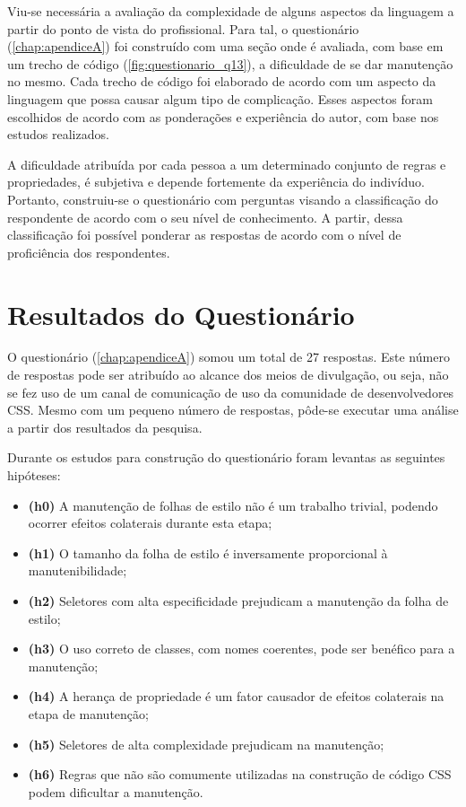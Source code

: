 Viu-se necessária a avaliação da complexidade de alguns aspectos da linguagem a partir do ponto de vista do profissional. Para tal, o questionário (\autoref{chap:apendiceA}) foi construído com uma seção onde é avaliada, com base em um trecho de código (\autoref{fig:questionario_q13}), a dificuldade de se dar manutenção no mesmo. Cada trecho de código foi elaborado de acordo com um aspecto da linguagem que possa causar algum tipo de complicação. Esses aspectos foram escolhidos de acordo com as ponderações e experiência do autor, com base nos estudos realizados.

A dificuldade atribuída por cada pessoa a um determinado conjunto de regras e propriedades, é subjetiva e depende fortemente da experiência do indivíduo. Portanto, construiu-se o questionário com perguntas visando a classificação do respondente de acordo com o seu nível de conhecimento. A partir, dessa classificação foi possível ponderar as respostas de acordo com o nível de proficiência dos respondentes.

\section{Resultados do Questionário}

O questionário (\autoref{chap:apendiceA}) somou um total de 27 respostas. Este número de respostas pode ser atribuído ao alcance dos meios de divulgação, ou seja, não se fez uso de um canal de comunicação de uso da comunidade de desenvolvedores CSS. Mesmo com um pequeno número de respostas, pôde-se executar uma análise a partir dos resultados da pesquisa. 

Durante os estudos para construção do questionário foram levantas as seguintes hipóteses:

\begin{itemize}
	\item \textbf{(h0)} A manutenção de folhas de estilo não é um trabalho trivial, podendo ocorrer efeitos colaterais durante esta etapa;
	\item \textbf{(h1)} O tamanho da folha de estilo é inversamente proporcional à manutenibilidade;
	\item \textbf{(h2)} Seletores com alta especificidade prejudicam a manutenção da folha de estilo;
	\item \textbf{(h3)} O uso correto de classes, com nomes coerentes, pode ser benéfico para a manutenção;
	\item \textbf{(h4)} A herança de propriedade é um fator causador de efeitos colaterais na etapa de manutenção;
	\item \textbf{(h5)} Seletores de alta complexidade prejudicam na manutenção;
	\item \textbf{(h6)} Regras que não são comumente utilizadas na construção de código CSS podem dificultar a manutenção.
\end{itemize}

